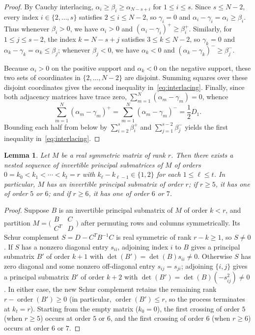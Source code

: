 \documentclass[10pt]{article}
\newtheorem{lemma}[theorem]{Lemma}
\begin{document}
\begin{proof}
By Cauchy interlacing, $\alpha_i \geq \beta_i \geq \alpha_{N-s+i}$ for $1 \leq i \leq s$. Since $s \leq N - 2$, every index $i \in \{2,\dots,s\}$ satisfies $2 \leq i \leq N-2$, so $\gamma_i = 0$ and $\alpha_i - \gamma_i = \alpha_i \geq \beta_i$. Thus whenever $\beta_i > 0$, we have $\alpha_i > 0$ and $(\alpha_i - \gamma_i)^+ \geq \beta_i^+$. Similarly, for $1 \leq j \leq s - 2$, the index $k = N - s + j$ satisfies $3 \leq k \leq N - 2$, so $\gamma_k = 0$ and $\alpha_k - \gamma_k = \alpha_k \leq \beta_j$; whenever $\beta_j < 0$, we have $\alpha_k < 0$ and $(\alpha_k - \gamma_k)^- \geq \beta_j^-$.

Because $\alpha_i > 0$ on the positive support and $\alpha_k < 0$ on the negative support, these two sets of coordinates in $\{2, \dots, N-2\}$ are disjoint. Summing squares over these disjoint coordinates gives the second inequality in~\eqref{eq:interlacing}. Finally, since both adjacency matrices have trace zero, $\sum_{m=1}^N (\alpha_m - \gamma_m) = 0$, whence
\[
\sum_{m=1}^N (\alpha_m - \gamma_m)^+ = \sum_{m=1}^N (\alpha_m - \gamma_m)^- = \frac{1}{2} D_1.
\]
Bounding each half from below by $\sum_{i=2}^s \beta_i^+$ and $\sum_{j=1}^{s-2} \beta_j^-$ yields the first inequality in~\eqref{eq:interlacing}.
\end{proof}

\begin{lemma}\label{lem:elimination}
Let $M$ be a real symmetric matrix of rank $r$. Then there exists a nested sequence of invertible principal submatrices of $M$ of orders $0 = k_0 < k_1 < \cdots < k_t = r$ with $k_{\ell} - k_{\ell-1} \in \{1,2\}$ for each $1 \leq \ell \leq t$. In particular, $M$ has an invertible principal submatrix of order $r$; if $r \geq 5$, it has one of order $5$ or $6$; and if $r \geq 6$, it has one of order $6$ or $7$.
\end{lemma}

\begin{proof}
Suppose $B$ is an invertible principal submatrix of $M$ of order $k < r$, and partition $M = \bigl(\begin{smallmatrix} B & C \\ C^T & D \end{smallmatrix}\bigr)$ after permuting rows and columns symmetrically. Its Schur complement $S = D - C^T B^{-1} C$ is real symmetric of rank $r - k \geq 1$, so $S \neq 0$. If $S$ has a nonzero diagonal entry $s_{ii}$, adjoining index $i$ to $B$ gives a principal submatrix $B'$ of order $k + 1$ with $\det(B') = \det(B) s_{ii} \neq 0$. Otherwise $S$ has zero diagonal and some nonzero off-diagonal entry $s_{ij} = s_{ji}$; adjoining $\{i,j\}$ gives a principal submatrix $B'$ of order $k + 2$ with $\det(B') = \det(B)(-s_{ij}^2) \neq 0$. In either case, the new Schur complement retains the remaining rank $r - \operatorname{order}(B') \geq 0$ (in particular, $\operatorname{order}(B') \leq r$, so the process terminates at $k_t = r$). Starting from the empty matrix ($k_0 = 0$), the first crossing of order $5$ (when $r \geq 5$) occurs at order $5$ or $6$, and the first crossing of order $6$ (when $r \geq 6$) occurs at order $6$ or $7$.
\end{proof}
\end{document}
